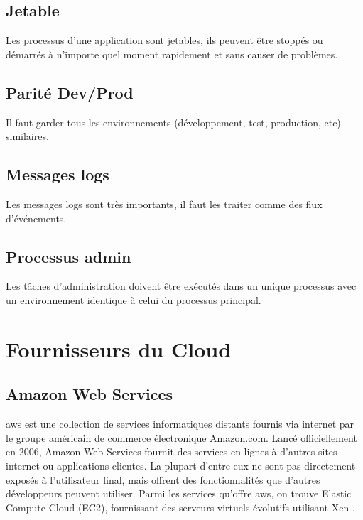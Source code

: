 \section*{Jetable}

Les processus d'une application sont jetables, ils peuvent être stoppés ou démarrés à n'importe quel moment rapidement et sans causer de problèmes.

\section*{Parité Dev/Prod}

Il faut garder tous les environnements (développement, test, production, etc) similaires.

\section*{Messages logs}

Les messages logs sont très importants, il faut les traiter comme des flux d'événements.

\section*{Processus admin}

Les tâches d'administration doivent être exécutés dans un unique processus avec un environnement identique à celui du processus principal. 

\chapter{Fournisseurs du Cloud}

\section*{Amazon Web Services}

\acrshort{aws} est une collection de services informatiques distants fournis via internet par le groupe américain de commerce électronique Amazon.com. Lancé officiellement en 2006, Amazon Web Services fournit des services en lignes à d'autres sites internet ou applications clientes. La plupart d'entre eux ne sont pas directement exposés à l'utilisateur final, mais offrent des fonctionnalités que d'autres développeurs peuvent utiliser. Parmi les services qu'offre \acrshort{aws}, on trouve Elastic Compute Cloud (EC2), fournissant des serveurs virtuels évolutifs utilisant Xen \cite{aws}. 

